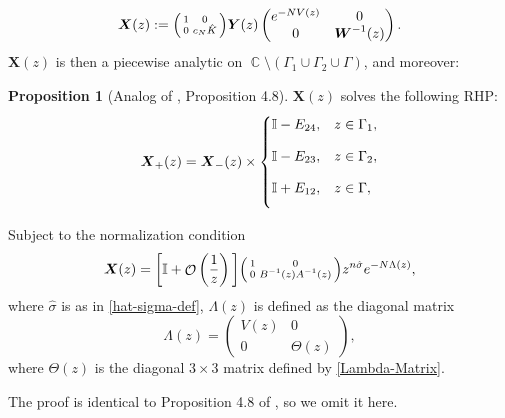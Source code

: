 \documentclass[usenames,dvipsnames]{article}
\theoremstyle{definition}
\newtheorem{prop}{Proposition}[section]
\DeclareMathOperator{\CC}{\mathbb{C}}
\DeclareMathOperator{\OO}{\mathcal{O}}
\numberwithin{equation}{section}
\numberwithin{figure}{section}
\begin{document}
\begin{equation}
        \boldsymbol{X}(z) := 
            \begin{psmallmatrix}
                1 & 0 \\
                0 & c_N \hat{K}
            \end{psmallmatrix}
            \boldsymbol{Y}(z)
                \begin{pmatrix}
                    e^{-NV(z)} & 0 \\
                    0 & \boldsymbol{W}^{-1}(z)
                \end{pmatrix}.
    \end{equation}
$\boldsymbol{X}(z)$ is then a piecewise analytic on $\CC\setminus \left(\Gamma_1 \cup \Gamma_2 \cup \Gamma\right)$, and moreover:
    \begin{prop}[Analog of \cite{DHL1}, Proposition 4.8]
        $\boldsymbol{X}(z)$ solves the following RHP:
           \begin{equation}
            \boldsymbol{X}_{+}(z) = \boldsymbol{X}_{-}(z) \times 
            \begin{cases}
            \mathbb{I}-E_{24}, & z \in \Gamma_1,\vspace{3mm}\\
            \mathbb{I}-E_{23}, & z \in \Gamma_2,\vspace{3mm}\\
            \mathbb{I}+E_{12}, & z \in \Gamma,\vspace{3mm}\\
            \end{cases}
        \end{equation}
        
        Subject to the normalization condition
    \begin{equation}\label{X-asymptotics}
        \boldsymbol{X}(z) = 
            \bigg[\mathbb{I} + \OO\left(\frac{1}{z}\right)\bigg]\begin{psmallmatrix}
                1 & 0\\
                0 & B^{-1}(z) A^{-1}(z) 
            \end{psmallmatrix}
            z^{n\hat{\sigma}}e^{-N\Lambda(z)},
        \end{equation}
        where $\hat{\sigma}$ is as in \eqref{hat-sigma-def}, $\Lambda(z)$ is defined as the diagonal matrix
    \begin{equation} 
        \Lambda(z) =
        \begin{pmatrix}
            V(z) & 0\\
            0 & \Theta(z)
        \end{pmatrix},
    \end{equation}
where $\Theta(z)$ is the diagonal $3\times 3$ matrix defined by \eqref{Lambda-Matrix}.
    \end{prop}
The proof is identical to Proposition 4.8 of \cite{DHL1}, so we omit it here. 
\end{document}

